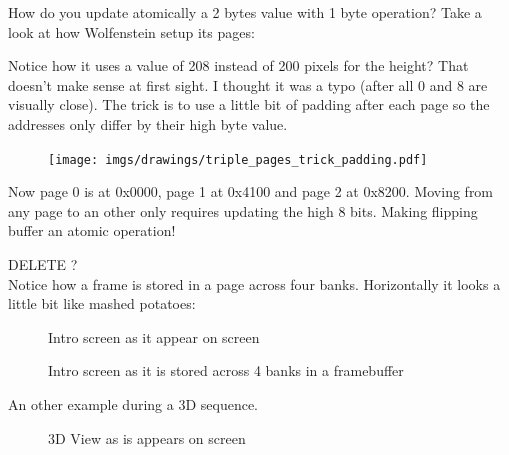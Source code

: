 \documentclass[book.tex]{subfiles}
\begin{document}
\par
How do you update atomically a 2 bytes value with 1 byte operation? Take a look at how Wolfenstein setup its pages:\\
\par
\begin{minipage}{\textwidth}
\begin{flushright}

\end{flushright}
\end{minipage}
\par
Notice how it uses a value of 208 instead of 200 pixels for the height? That doesn't make sense at first sight. I thought it was a typo (after all 0 and 8 are visually close). The trick is to use a little bit of padding after each page so the addresses only differ by their high byte value.


\par
\begin{figure}[H]
 \centering
 \texttt{[image: imgs/drawings/triple\_pages\_trick\_padding.pdf]}
\end{figure}
\par



\par
Now page 0 is at 0x0000, page 1 at 0x4100 and page 2 at 0x8200. Moving from any page to an other only requires updating the high 8 bits. Making flipping buffer an atomic operation!\\








\par
\par
DELETE ?\\
Notice how a frame is stored in a page across four banks. Horizontally it looks a little bit like mashed potatoes:
 \begin{figure}[H]
\centering
 \caption{Intro screen as it appear on screen}
 \end{figure}
 \par
 \begin{figure}[H]
\centering
 \caption{Intro screen as it is stored across 4 banks in a framebuffer} \label{fig:vga_layout_for_intro}
 \end{figure}
\par
An other example during a 3D sequence.
\begin{figure}[H]
\centering
 \caption{3D View as is appears on screen} \label{fig:vga_layout_in_3D}
 \end{figure}
 \par
\end{document}
